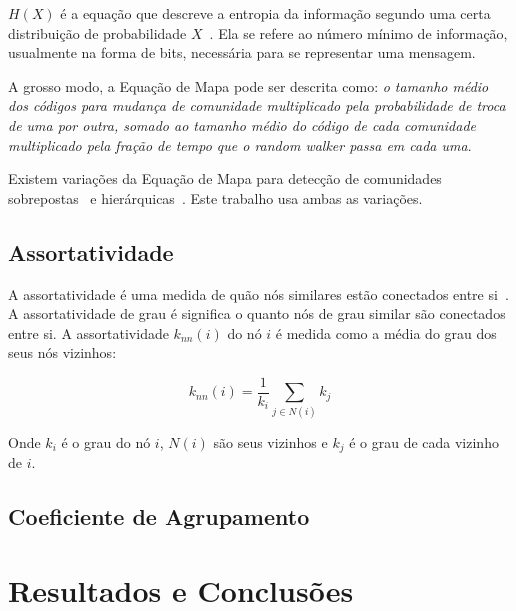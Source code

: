 \documentclass[
  article,
  11pt,
  a4paper,
  english,
  brazil,
  sumario=tradicional]{abntex2}
\begin{document}
$H(X)$ é a equação que descreve a entropia da informação segundo uma certa distribuição de probabilidade $X$~\cite{Shannon1948-ic}. Ela se refere ao número mínimo de informação, usualmente na forma de bits, necessária para se representar uma mensagem.

A grosso modo, a Equação de Mapa pode ser descrita como: \textit{o tamanho médio dos códigos para mudança de comunidade multiplicado pela probabilidade de troca de uma por outra, somado ao tamanho médio do código de cada comunidade multiplicado pela fração de tempo que o \textit{random walker} passa em cada uma}.

Existem variações da Equação de Mapa para detecção de comunidades sobrepostas~\cite{Viamontes_Esquivel2011-it} e hierárquicas~\cite{Rosvall2011-yi}. Este trabalho usa ambas as variações.

\subsection{Assortatividade} \label{sec:assortatividade}

A assortatividade é uma medida de quão nós similares estão conectados entre si~\cite{Barabasi2016-rn}. A assortatividade de grau é significa o quanto nós de grau similar são conectados entre si. A assortatividade $k_\textit{nn}(i)$ do nó $i$ é medida como a média do grau dos seus nós vizinhos:

\begin{equation}
k_\textit{nn}(i) = \frac{1}{k_i} \sum_{j \in N(i)} k_j
\end{equation}

Onde $k_i$ é o grau do nó $i$, $N(i)$ são seus vizinhos e $k_j$ é o grau de cada vizinho de $i$.

\subsection{Coeficiente de Agrupamento} \label{sec:coef-agrupamento}

\section{Resultados e Conclusões} \label{sec:resultados}

\end{document}
